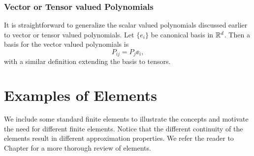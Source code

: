 \subsubsection{Vector or Tensor valued Polynomials}
It is straightforward to generalize the scalar valued polynomials discussed
earlier to vector or tensor valued polynomials. Let $\{e_i\}$ be canonical
basis in ${\mathbb R}^d$. Then a basis for the vector valued polynomials is
\[
P_{ij} = P_j \ee_i,
\]
with a similar definition extending the basis to tensors.


\section{Examples of Elements}

We include some standard finite elements to illustrate the concepts and
motivate the need for different finite elements. Notice
that the different continuity of the elements result in
different approximation properties. 
We refer the reader to Chapter \cite{} for a more thorough review of 
elements.   


